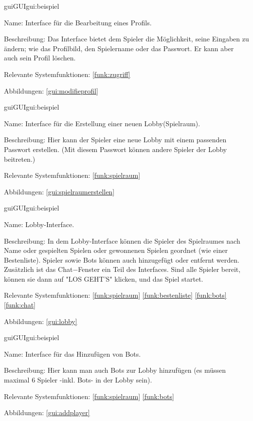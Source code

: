 \begin{description}[leftmargin=5em, style=sameline]	
	\begin{lhp}{gui}{GUI}{gui:beispiel}
		\item[Name:] Interface für die Bearbeitung eines Profils.
		\item[Beschreibung:] Das Interface bietet dem Spieler die Möglichkeit, seine Eingaben zu ändern; wie das Profilbild, den Spielername oder das Passwort. Er kann aber auch sein Profil löschen.
		\item[Relevante Systemfunktionen:] \ref{funk:zugriff}
		\item[Abbildungen:] \ref{gui:modifieprofil}
	\end{lhp}
\end{description}
\begin{description}[leftmargin=5em, style=sameline]	
	\begin{lhp}{gui}{GUI}{gui:beispiel}
		\item[Name:] Interface für die Erstellung einer neuen Lobby(Spielraum).
		\item[Beschreibung:] Hier kann der Spieler eine neue Lobby mit einem passenden Passwort erstellen. (Mit diesem Passwort können andere Spieler der Lobby beitreten.)
		\item[Relevante Systemfunktionen:] \ref{funk:spielraum}
		\item[Abbildungen:] \ref{gui:spielraumerstellen}
	\end{lhp}
\end{description}
\begin{description}[leftmargin=5em, style=sameline]	
	\begin{lhp}{gui}{GUI}{gui:beispiel}
		\item[Name:] Lobby-Interface.
		\item[Beschreibung:] In dem Lobby-Interface können die Spieler des Spielraumes nach Name oder gespielten Spielen oder gewonnenen Spielen geordnet (wie einer Bestenliste). Spieler sowie Bots können auch hinzugefügt oder entfernt werden. Zusätzlich ist das Chat$-$Fenster ein Teil des Interfaces. Sind alle Spieler bereit, können sie dann auf "LOS GEHT'S" klicken, und das Spiel startet.
		\item[Relevante Systemfunktionen:] \ref{funk:spielraum} \ref{funk:bestenliste} \ref{funk:bots} \ref{funk:chat}
		\item[Abbildungen:] \ref{gui:lobby}
	\end{lhp}
\end{description}
\begin{description}[leftmargin=5em, style=sameline]	
	\begin{lhp}{gui}{GUI}{gui:beispiel}
		\item[Name:] Interface für das Hinzufügen von Bots.
		\item[Beschreibung:] Hier kann man auch Bots zur Lobby hinzufügen (es müssen maximal 6 Spieler -inkl. Bots- in der Lobby sein).
		\item[Relevante Systemfunktionen:] \ref{funk:spielraum} \ref{funk:bots}
		\item[Abbildungen:] \ref{gui:addplayer}
	\end{lhp}
\end{description}
